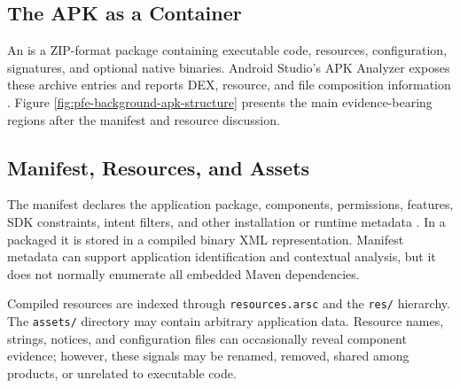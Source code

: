 \subsection{The APK as a Container}

An \APK is a ZIP-format package containing executable code, resources,
configuration, signatures, and optional native binaries. Android Studio's APK
Analyzer exposes these archive entries and reports DEX, resource, and file
composition information \cite{androidApkAnalyzer}. Figure
\ref{fig:pfe-background-apk-structure} presents the main evidence-bearing
regions after the manifest and resource discussion.

\subsection{Manifest, Resources, and Assets}

The manifest declares the application package, components, permissions,
features, SDK constraints, intent filters, and other installation or runtime
metadata \cite{androidManifestOverview}. In a packaged \APK it is stored in a
compiled binary XML representation. Manifest metadata can support application
identification and contextual analysis, but it does not normally enumerate
all embedded Maven dependencies.

Compiled resources are indexed through \texttt{resources.arsc} and the
\texttt{res/} hierarchy. The \texttt{assets/} directory may contain arbitrary
application data. Resource names, strings, notices, and configuration files
can occasionally reveal component evidence; however, these signals may be
renamed, removed, shared among products, or unrelated to executable code.

